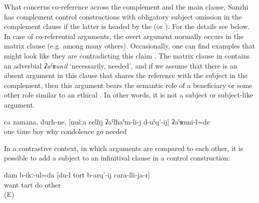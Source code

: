 What concerns co-reference across the complement and the main clause, Sanzhi has complement control constructions with obligatory subject omission in the complement clause if the latter is headed by the  (or ). For the details see  below. In case of co-referential arguments, the overt argument normally occurs in the matrix clause (e.g.  among many others). Occasionally, one can find examples that might look like they are contradicting this claim . The matrix clause in  contains an adverbial \textit{ʡaˁʁunil} `necessarily, needed', and if we assume that there is an absent argument in this clause that shares the reference with the subject in the complement, then this argument bears the semantic role of a beneficiary or some other role similar to an ethical . In other words, it is not a subject or subject-like argument.
%
\begin{exe}
	\ex	\label{ex:‎‎‎One time, guys, we had for some reason to go to say condolences}
	\gll	ca	zamana,	durħ-ne,	[nušːa	cellij	ʡaˁlħaˁm-li-j	d-uˁq'-ij]	ʡaˁʁuni-l=de\\
		one	time		boy		why	condolence	go	needed\\
	\glt	{}
\end{exe}

In a contrastive context, in which arguments are compared to each other, it is possible to add a subject to an infinitival clause in a control construction:
%
\begin{exe}
	\ex	\label{ex:‎I want to make the tart than another person}
	\gll	dam	b-ikː-ul=da	[du-l	tort	b-arq'-ij	cara-lli-ja-r]\\
			want		tart do	other\\
	\glt	{} (E)
\end{exe}

